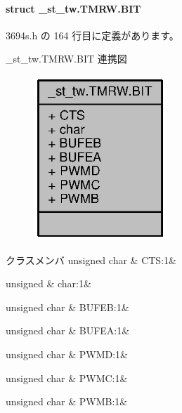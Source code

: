 \paragraph{struct \+\_\+st\+\_\+tw.\+T\+M\+R\+W.\+B\+I\+T}


 3694s.\+h の 164 行目に定義があります。



\+\_\+st\+\_\+tw.\+T\+M\+R\+W.\+B\+I\+T 連携図
\nopagebreak
\begin{figure}[H]
\begin{center}
\leavevmode
\includegraphics[width=142pt]{d8/de2/struct__st__tw_8TMRW_8BIT__coll__graph}
\end{center}
\end{figure}
\begin{DoxyFields}{クラスメンバ}
unsigned char\label{3694s_8h_ae16433ffd3adc248f0ce2608a95c3c76}
&
C\+T\+S\+:1&
\\
\hline

unsigned\label{3694s_8h_aa87deb01c5f539e6bda34829c8ef2368}
&
char\+:1&
\\
\hline

unsigned char\label{3694s_8h_a662fc543e2d6bf5215e89276a710e922}
&
B\+U\+F\+E\+B\+:1&
\\
\hline

unsigned char\label{3694s_8h_ae376428be786b0357ea46b1a3dd3220a}
&
B\+U\+F\+E\+A\+:1&
\\
\hline

unsigned char\label{3694s_8h_af79436c1b95f81d697431a95bd0ed231}
&
P\+W\+M\+D\+:1&
\\
\hline

unsigned char\label{3694s_8h_af8277dfd206c4b505d66d79c003d908d}
&
P\+W\+M\+C\+:1&
\\
\hline

unsigned char\label{3694s_8h_a7c4eceb434cbef53910a6cc0d302f311}
&
P\+W\+M\+B\+:1&
\\
\hline

\end{DoxyFields}
\label{union__st__tw_8TCRW}

